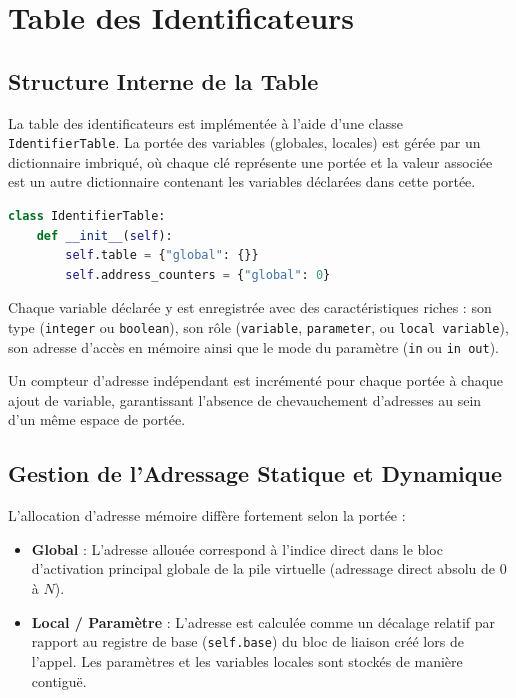 \documentclass[a4paper, 12pt]{article}
\begin{document}
\newpage

\section{Table des Identificateurs}

\subsection{Structure Interne de la Table}
La table des identificateurs est implémentée à l'aide d'une classe \texttt{IdentifierTable}. La portée des variables (globales, locales) est gérée par un dictionnaire imbriqué, où chaque clé représente une portée et la valeur associée est un autre dictionnaire contenant les variables déclarées dans cette portée. 

\begin{lstlisting}[language=python, caption=Structure de base de la Table des Identificateurs]
class IdentifierTable:
    def __init__(self):
        self.table = {"global": {}}
        self.address_counters = {"global": 0}
\end{lstlisting}

Chaque variable déclarée y est enregistrée avec des caractéristiques riches : son type (\texttt{integer} ou \texttt{boolean}), son rôle (\texttt{variable}, \texttt{parameter}, ou \texttt{local variable}), son adresse d'accès en mémoire ainsi que le mode du paramètre (\texttt{in} ou \texttt{in out}). 

Un compteur d'adresse indépendant est incrémenté pour chaque portée à chaque ajout de variable, garantissant l'absence de chevauchement d'adresses au sein d'un même espace de portée.

\subsection{Gestion de l'Adressage Statique et Dynamique}
L'allocation d'adresse mémoire diffère fortement selon la portée :
\begin{itemize}
    \item \textbf{Global} : L'adresse allouée correspond à l'indice direct dans le bloc d'activation principal globale de la pile virtuelle (adressage direct absolu de 0 à $N$).
    \item \textbf{Local / Paramètre} : L'adresse est calculée comme un décalage relatif par rapport au registre de base (\texttt{self.base}) du bloc de liaison créé lors de l'appel. Les paramètres et les variables locales sont stockés de manière contiguë.
\end{itemize}
\end{document}
